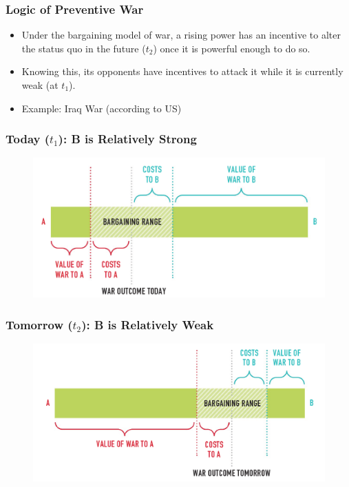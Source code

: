 \documentclass{beamer}
\begin{document}
\begin{frame} 
	\frametitle{\LARGE{Logic of Preventive War}}
	\begin{itemize}
		\item Under the bargaining model of war, a rising power has an incentive to alter the status quo in the future ($t_2$) once it is powerful enough to do so. \pause
		\item Knowing this, its opponents have incentives to attack it while it is currently weak (at $t_1$). \pause 
		\item Example: Iraq War (according to US)
	\end{itemize}
\end{frame}

\begin{frame} 
	\frametitle{\LARGE{Today ($t_1$): B is Relatively Strong}}
	\begin{figure}[ht!]
		\centering
		\includegraphics[width=\textwidth,height=0.8\textheight,keepaspectratio]{./cred1.png}
	\end{figure}
\end{frame}

\begin{frame} 
	\frametitle{\LARGE{Tomorrow ($t_2$): B is Relatively Weak}}
	\begin{figure}[ht!]
		\centering
		\includegraphics[width=\textwidth,height=0.8\textheight,keepaspectratio]{./cred2.png}
	\end{figure}
\end{frame}
\end{document}
